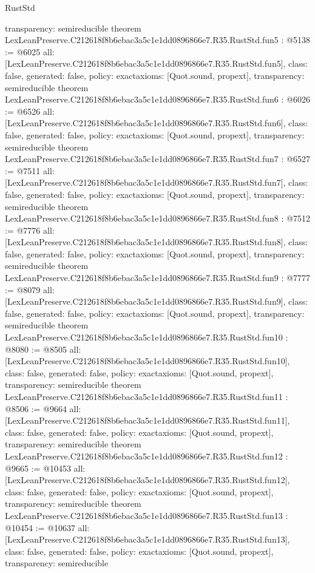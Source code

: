 \begin{lexlean}{RustStd}
\begin{coremodule}
{  transparency: semireducible
}
theorem LexLeanPreserve.C212618f8b6ebac3a5c1e1dd0896866e7.R35.RustStd.fun5 : @5138 := @6025 {
  all: [LexLeanPreserve.C212618f8b6ebac3a5c1e1dd0896866e7.R35.RustStd.fun5],
  class: false,
  generated: false,
  policy: exact{axioms: [Quot.sound, propext]},
  transparency: semireducible
}
theorem LexLeanPreserve.C212618f8b6ebac3a5c1e1dd0896866e7.R35.RustStd.fun6 : @6026 := @6526 {
  all: [LexLeanPreserve.C212618f8b6ebac3a5c1e1dd0896866e7.R35.RustStd.fun6],
  class: false,
  generated: false,
  policy: exact{axioms: [Quot.sound, propext]},
  transparency: semireducible
}
theorem LexLeanPreserve.C212618f8b6ebac3a5c1e1dd0896866e7.R35.RustStd.fun7 : @6527 := @7511 {
  all: [LexLeanPreserve.C212618f8b6ebac3a5c1e1dd0896866e7.R35.RustStd.fun7],
  class: false,
  generated: false,
  policy: exact{axioms: [Quot.sound, propext]},
  transparency: semireducible
}
theorem LexLeanPreserve.C212618f8b6ebac3a5c1e1dd0896866e7.R35.RustStd.fun8 : @7512 := @7776 {
  all: [LexLeanPreserve.C212618f8b6ebac3a5c1e1dd0896866e7.R35.RustStd.fun8],
  class: false,
  generated: false,
  policy: exact{axioms: [Quot.sound, propext]},
  transparency: semireducible
}
theorem LexLeanPreserve.C212618f8b6ebac3a5c1e1dd0896866e7.R35.RustStd.fun9 : @7777 := @8079 {
  all: [LexLeanPreserve.C212618f8b6ebac3a5c1e1dd0896866e7.R35.RustStd.fun9],
  class: false,
  generated: false,
  policy: exact{axioms: [Quot.sound, propext]},
  transparency: semireducible
}
theorem LexLeanPreserve.C212618f8b6ebac3a5c1e1dd0896866e7.R35.RustStd.fun10 : @8080 := @8505 {
  all: [LexLeanPreserve.C212618f8b6ebac3a5c1e1dd0896866e7.R35.RustStd.fun10],
  class: false,
  generated: false,
  policy: exact{axioms: [Quot.sound, propext]},
  transparency: semireducible
}
theorem LexLeanPreserve.C212618f8b6ebac3a5c1e1dd0896866e7.R35.RustStd.fun11 : @8506 := @9664 {
  all: [LexLeanPreserve.C212618f8b6ebac3a5c1e1dd0896866e7.R35.RustStd.fun11],
  class: false,
  generated: false,
  policy: exact{axioms: [Quot.sound, propext]},
  transparency: semireducible
}
theorem LexLeanPreserve.C212618f8b6ebac3a5c1e1dd0896866e7.R35.RustStd.fun12 : @9665 := @10453 {
  all: [LexLeanPreserve.C212618f8b6ebac3a5c1e1dd0896866e7.R35.RustStd.fun12],
  class: false,
  generated: false,
  policy: exact{axioms: [Quot.sound, propext]},
  transparency: semireducible
}
theorem LexLeanPreserve.C212618f8b6ebac3a5c1e1dd0896866e7.R35.RustStd.fun13 : @10454 := @10637 {
  all: [LexLeanPreserve.C212618f8b6ebac3a5c1e1dd0896866e7.R35.RustStd.fun13],
  class: false,
  generated: false,
  policy: exact{axioms: [Quot.sound, propext]},
  transparency: semireducible
}
\end{coremodule}
\end{lexlean}
